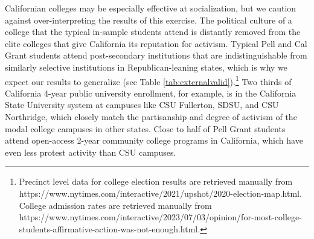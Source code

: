 \documentclass[12pt,letterpaper,oneside]{book}
\begin{document}
Californian colleges may be especially effective at socialization, but we caution against over-interpreting the results of this exercise. The political culture of a college that the typical in-sample students attend is distantly removed from the elite colleges that give California its reputation for activism. Typical Pell and Cal Grant students attend post-secondary institutions that are indistinguishable from similarly selective institutions in Republican-leaning states, which is why we expect our results to generalize (see Table \ref{tab:externalvalid}).\footnote{Precinct level data for college election results are retrieved manually from https://www.nytimes.com/interactive/2021/upshot/2020-election-map.html. College admission rates are retrieved manually from https://www.nytimes.com/interactive/2023/07/03/opinion/for-most-college-students-affirmative-action-was-not-enough.html.} Two thirds of California 4-year public university enrollment, for example, is in the California State University system at campuses like CSU Fullerton, SDSU, and CSU Northridge, which closely match the partisanship and degree of activism of the modal college campuses in other states. Close to half of Pell Grant students attend open-access 2-year community college programs in California, which have even less protest activity than CSU campuses.


\clearpage
\end{document}
